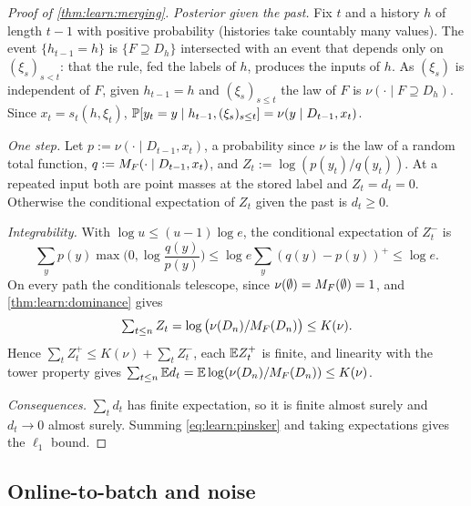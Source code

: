 \begin{proof}[Proof of \cref{thm:learn:merging}]
\emph{Posterior given the past.} Fix $t$ and a history $h$ of length $t-1$ with positive probability (histories take countably many values). The event $\{h_{t-1}=h\}$ is $\{F\supseteq D_h\}$ intersected with an event that depends only on $(\xi_s)_{s<t}$: that the rule, fed the labels of $h$, produces the inputs of $h$. As $(\xi_s)$ is independent of $F$, given $h_{t-1}=h$ and $(\xi_s)_{s\le t}$ the law of $F$ is $\nu(\cdot\mid F\supseteq D_h)$. Since $x_t=s_t(h,\xi_t)$, $\mathbb{P}[y_t=y\mid h_{t-1},(\xi_s)_{s\le t}]=\nu(y\mid D_{t-1},x_t)$.

\emph{One step.} Let $p:=\nu(\cdot\mid D_{t-1},x_t)$, a probability since $\nu$ is the law of a random total function, $q:=M_{F}(\cdot\mid D_{t-1},x_t)$, and $Z_t:=\log(p(y_t)/q(y_t))$. At a repeated input both are point masses at the stored label and $Z_t=d_t=0$. Otherwise the conditional expectation of $Z_t$ given the past is $d_t\ge0$.

\emph{Integrability.} With $\log u\le(u-1)\log e$, the conditional expectation of $Z_t^-$ is
\[\textstyle\sum_yp(y)\max\big(0,\log\frac{q(y)}{p(y)}\big)\le\log e\sum_y(q(y)-p(y))^+\le\log e.\] On every path the conditionals telescope, since $\nu(\emptyset)=M_{F}(\emptyset)=1$, and \cref{thm:learn:dominance} gives
\[\textstyle\sum_{t\le n}Z_t=\log\big(\nu(D_n)/M_{F}(D_n)\big)\le K(\nu).\]
Hence $\sum_tZ_t^+\le K(\nu)+\sum_tZ_t^-$, each $\mathbb{E} Z_t^+$ is finite, and linearity with the tower property gives $\sum_{t\le n}\mathbb{E} d_t=\mathbb{E}\log(\nu(D_n)/M_{F}(D_n))\le K(\nu)$.

\emph{Consequences.} $\sum_td_t$ has finite expectation, so it is finite almost surely and $d_t\to0$ almost surely. Summing \eqref{eq:learn:pinsker} and taking expectations gives the $\ell_1$ bound.
\end{proof}

\subsection{Online-to-batch and noise}\label{app:learn:batch}

